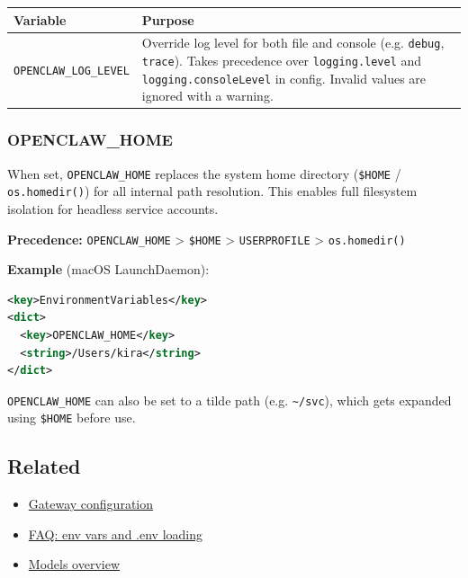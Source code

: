 \begin{table}[h]
\centering
\small
\begin{tabular}{|l|l|}
\hline
Variable & Purpose \\
\hline
\texttt{OPENCLAW\_LOG\_LEVEL} & Override log level for both file and console (e.g. \texttt{debug}, \texttt{trace}). Takes precedence over \texttt{logging.level} and \texttt{logging.consoleLevel} in config. Invalid values are ignored with a warning. \\
\hline
\end{tabular}
\end{table}



\subsubsection{OPENCLAW\_HOME}


When set, \texttt{OPENCLAW\_HOME} replaces the system home directory (\texttt{\$HOME} / \texttt{os.homedir()}) for all internal path resolution. This enables full filesystem isolation for headless service accounts.

\textbf{Precedence:} \texttt{OPENCLAW\_HOME} > \texttt{\$HOME} > \texttt{USERPROFILE} > \texttt{os.homedir()}

\textbf{Example} (macOS LaunchDaemon):

\begin{lstlisting}[language=xml]
<key>EnvironmentVariables</key>
<dict>
  <key>OPENCLAW_HOME</key>
  <string>/Users/kira</string>
</dict>
\end{lstlisting}


\texttt{OPENCLAW\_HOME} can also be set to a tilde path (e.g. \texttt{\textasciitilde{}/svc}), which gets expanded using \texttt{\$HOME} before use.

\subsection{Related}


\begin{itemize}
  \item \href{/gateway/configuration}{Gateway configuration}
  \item \href{/help/faq\#env-vars-and-env-loading}{FAQ: env vars and .env loading}
  \item \href{/concepts/models}{Models overview}
\end{itemize}



